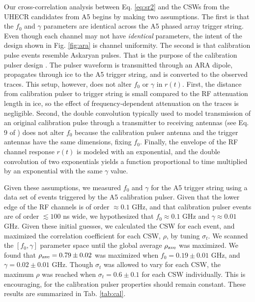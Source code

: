 \documentclass[amsmath,amssymb,aps,prd,10pt,twocolumn,showkeys]{revtex4}
\begin{document}
Our cross-correlation analysis between Eq. \ref{eq:sr2} and the CSWs from the UHECR candidates from A5 begins by making two assumptions.  The first is that the $f_0$ and $\gamma$ parameters are identical across the A5 phased array trigger string.  Even though each channel may not have \textit{identical} parameters, the intent of the design shown in Fig. \ref{fig:ara} is channel uniformity.  The second is that calibration pulse events resemble Askaryan pulses.  That is the purpose of the calibration pulser design \cite{allison2012design-cd3,allison2022lowthreshold-795}.  The pulser waveform is transmitted through an ARA dipole, propagates through ice to the A5 trigger string, and is converted to the observed traces.  This setup, however, does not alter $f_0$ or $\gamma$ in $r(t)$.  First, the distance from calibration pulser to trigger string is small compared to the RF attenuation length in ice, so the effect of frequency-dependent attenuation on the traces is negligible.  Second, the double convolution typically used to model transmission of an original calibration pulse through a transmitter to receiving antennas (see Eq. 9 of \cite{barwick2015timedomain-461}) does not alter $f_0$ because the calibration pulser antenna and the trigger antennas have the same dimensions, fixing $f_0$.  Finally, the envelope of the RF channel response $r(t)$ is modeled with an exponential, and the double convolution of two exponentials yields a function proportional to time multiplied by an exponential with the same $\gamma$ value.

Given these assumptions, we measured $f_0$ and $\gamma$ for the A5 trigger string using a data set of events triggered by the A5 calibration pulser.  Given that the lower edge of the RF channels is of order $\approx 0.1$ GHz, and that calibration pulser events are of order $\lesssim 100$ ns wide, we hypothesized that $f_0 \approx 0.1$ GHz and $\gamma \approx 0.01$ GHz.  Given these initial guesses, we calculated the CSW for each event, and maximized the correlation coefficient for each CSW, $\rho$, by tuning $\sigma_t$.  We scanned the $[f_0,\gamma]$ parameter space until the global average $\rho_{\rm ave}$ was maximized.  We found that $\rho_{\rm ave} = 0.79\pm 0.02$ was maximized when $f_0 = 0.19\pm 0.01$ GHz, and $\gamma = 0.02\pm 0.01$ GHz.  Though $\sigma_t$ was allowed to vary for each CSW, the maximum $\rho$ was reached when $\sigma_t = 0.6\pm 0.1$ for each CSW individually.  This is encouraging, for the calibration pulser properties should remain constant.  These results are summarized in Tab. \ref{tab:cal}.
\end{document}
